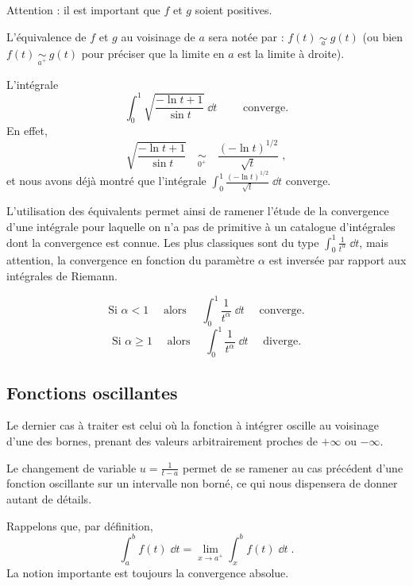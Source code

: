 \documentclass[class=report,crop=false]{standalone}
\begin{document}
Attention : il est important que $f$ et $g$ soient positives.

L'équivalence de $f$ et $g$ au voisinage de $a$ sera notée par : 
$\displaystyle f(t) \ \underset{a}{\sim}\ g(t)$ (ou bien 
$\displaystyle f(t) \ \underset{a^+}{\sim}\ g(t)$ pour préciser 
que la limite en $a$ est la limite à droite).


\begin{exemple}
L'intégrale 
$$\int_0^1 \sqrt{\frac{-\ln t+1}{\sin t}}\;\dd t\qquad\text{ converge.}$$
En effet,
$$\sqrt{\frac{-\ln t+1}{\sin t}} \quad\underset{0^+}{\sim}\quad
\frac{(-\ln t)^{1/2}}{\sqrt{t}}\;,$$
et nous avons déjà montré que l'intégrale 
$\int_0^1 \frac{(-\ln t)^{1/2}}{\sqrt{t}}\;\dd t$ converge.   
\end{exemple}

\bigskip

L'utilisation des équivalents permet ainsi de ramener l'étude de la
convergence d'une intégrale pour laquelle on n'a pas de primitive
à un catalogue d'intégrales dont la convergence est connue. Les
plus classiques sont du type $\int_0^1 \frac{1}{t^\alpha}\;\dd t$, mais
attention, la convergence en fonction du paramètre $\alpha$ est
inversée par rapport aux intégrales de Riemann.

\begin{exemple}
$$\text{Si } \alpha < 1\quad \text{ alors } \quad \int_0^1 \frac{1}{t^\alpha}\;\dd t
\quad\text{ converge.}$$
$$\text{Si } \alpha \ge 1\quad \text{ alors } \quad \int_0^1 \frac{1}{t^\alpha}\;\dd t
\quad\text{ diverge.}$$  
\end{exemple}

\subsection{Fonctions oscillantes}


Le dernier cas à traiter est celui où la fonction à intégrer
oscille au voisinage d'une des bornes, prenant des valeurs
arbitrairement proches de $+\infty$ ou $-\infty$.  


Le changement de variable $u=\frac{1}{t-a}$ permet de se ramener au cas
précédent d'une fonction oscillante sur un intervalle non borné, 
ce qui nous dispensera de donner autant de détails.

Rappelons que, par définition,
$$\int_a^b f(t)\;\dd t = \lim_{x\rightarrow a^+} \int_x^b f(t)\;\dd t\;.$$
La notion importante est toujours la convergence absolue.
\end{document}
